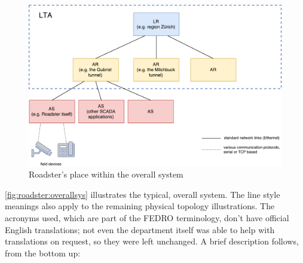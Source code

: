 \begin{figure}[]
	\includegraphics[width=\textwidth]{img/overall_system.pdf}
	\caption{Roadster's place within the overall system}
	\label{fig:roadster:overallsys}
\end{figure}

\autoref{fig:roadster:overallsys} illustrates the typical, overall system. The line
style meanings also apply to the remaining physical topology illustrations. The acronyms
used, which are part of the \gls{FEDRO} terminology, don't have official
English translations; not even the department itself was able to help with
translations on request, so they were left unchanged. A brief description
follows, from the bottom up:

